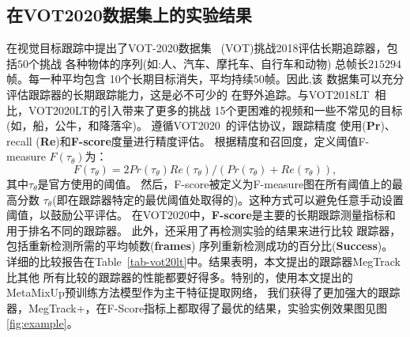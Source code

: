 \documentclass[promaster]{thesis-uestc}
\begin{document}
\subsection{在VOT2020数据集上的实验结果}
在视觉目标跟踪中提出了VOT-2020数据集~\cite{kristan2019seventh}
(VOT)挑战2018评估长期追踪器，包括$50$个挑战
各种物体的序列(如:人、汽车、摩托车、自行车和动物)
总帧长$215294$帧。每一种平均包含
10个长期目标消失，平均持续50帧。因此,该
数据集可以充分评估跟踪器的长期跟踪能力，这是必不可少的
在野外追踪。与VOT2018LT~\cite{VOT18}相比，VOT2020LT的引入带来了更多的挑战
15个更困难的视频和一些不常见的目标(如，船，公牛，和降落伞)。
遵循VOT2020~\cite{kristan2019seventh}的评估协议，跟踪精度
使用(\textbf{Pr})、recall (\textbf{Re})和\textbf{F-score}度量进行精度评估。
根据精度和召回度，定义阈值F-measure $F(\tau_{\theta})$为：
\begin{equation}
    \label{Fscore}
    F(\tau_{\theta}) = 2Pr(\tau_{\theta})Re(\tau_{\theta}) / (Pr(\tau_{\theta}) + Re(\tau_{\theta})), 
\end{equation}
其中$\tau_{\theta}$是官方使用的阈值。 然后，F-score被定义为F-measure图在所有阈值上的最高分数
$\tau_{\theta}$(即在跟踪器特定的最优阈值处取得的)。这种方式可以避免任意手动设置阈值，以鼓励公平评估。
在VOT2020中，\textbf{F-score}是主要的长期跟踪测量指标和用于排名不同的跟踪器。
此外，还采用了再检测实验的结果来进行比较
跟踪器，包括重新检测所需的平均帧数(\textbf{frames})
序列重新检测成功的百分比(\textbf{Success})。
详细的比较报告在Table~\ref{tab-vot20lt}中。结果表明，本文提出的跟踪器MegTrack比其他
所有比较的跟踪器的性能都要好得多。特别的，使用本文提出的MetaMixUp预训练方法模型作为主干特征提取网络，
我们获得了更加强大的跟踪器，MegTrack+，在F-Score指标上都取得了最优的结果，实验实例效果图见图\ref{fig:example}。
\end{document}
